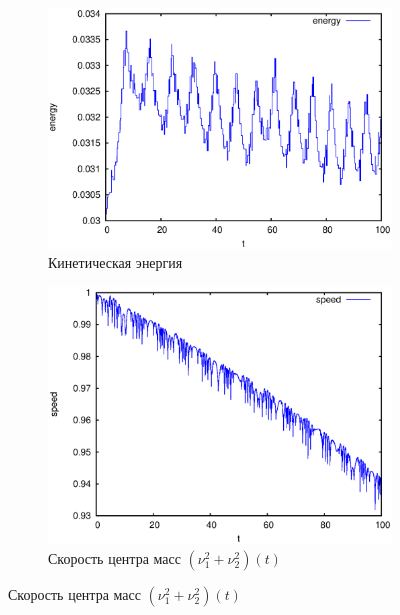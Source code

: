 \begin{figure}[H]
    \centering
    \begin{subfigure}[t]{0.45\textwidth}
        \centering
        \includegraphics[width=\linewidth]{pic/rol__wrench__kinetic_energy}
        \caption{Кинетическая энергия}
        \label{fig:rol__wrench__kinetic_energy}
    \end{subfigure}
    \begin{subfigure}[t]{0.45\textwidth}
        \centering
        \includegraphics[width=\linewidth]{pic/rol__wrench__speed_of_center_of_mass}
        \caption{Скорость центра масс $\left(\nu_1^2 + \nu_2^2\right)(t)$}
        \label{fig:rol__wrench__speed_of_center_of_mass}
    \end{subfigure}
    \vspace{12pt}
    

\end{figure}
